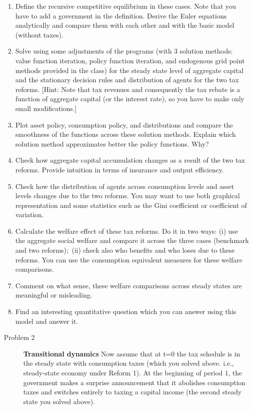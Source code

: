 \documentclass[11pt, a4paper, reqno]{article}
\begin{document}
\begin{enumerate}
\item Define the recursive competitive equilibrium in these cases. Note that
you have to add a government in the definition. Derive the Euler equations analytically and compare them with each other and with the basic model (without taxes).

\item Solve using some adjustments of the programs (with 3 solution methods: value function iteration, policy function iteration, and endogenous grid point methods provided in the class) for the steady state level of aggregate capital and the stationary decision rules and
distribution of agents for the two tax reforms. [Hint: Note that tax revenues and consequently the tax rebate is a function of aggregate capital (or the interest rate), so you have to make only small modifications.] 

\item Plot asset policy, consumption policy, and distributions and compare the smoothness of the functions across these solution methods. Explain which solution method approximates better the policy functions. Why?

\item Check how aggregate capital accumulation changes as a result of the
two tax reforms. Provide intuition in terms of insurance and output
efficiency.

\item Check how the distribution of agents across consumption levels and
asset levels changes due to the two reforms. You may want to use both
graphical representation and some statistics such as the Gini coefficient or
coefficient of variation.

\item Calculate the welfare effect of these tax reforms. Do it in two ways:
(i) use the aggregate social welfare and compare it across the three cases
(benchmark and two reforms);\ (ii) check also who benefits and who loses due
to these reforms. You can use the consumption equivalent measures for these welfare
comparisons.

\item Comment on what sense, these welfare comparisons across steady states
are meaningful or misleading.

\item Find an interesting quantitative question which you can answer using
this model and answer it.

\end{enumerate}
\begin{description}
\item[Problem 2] \textbf{Transitional dynamics} \newline
Now assume that at t=0 the tax schedule is in the steady state with consumption taxes (which you solved above. i.e., steady-state economy under Reform 1). At the beginning of period $1$, the government makes a surprise announcement that it abolishes consumption taxes and switches entirely to taxing a capital income (the second steady state you solved above).

\end{description}
\end{document}
